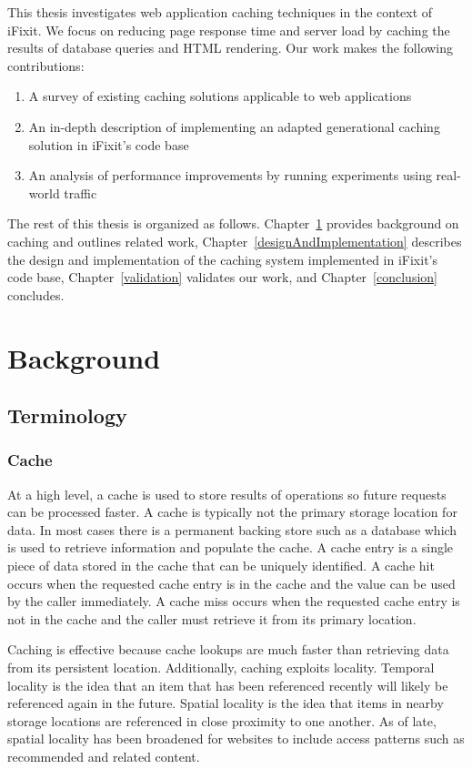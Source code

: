 \documentclass[12pt]{ucthesis}
\begin{document}
This thesis investigates web application caching techniques in the context of \textsf{iFixit}.
We focus on reducing page response time and server load by caching the results of database queries and HTML rendering.
Our work makes the following contributions:

\begin{enumerate}
   \item A survey of existing caching solutions applicable to web applications
   \item An in-depth description of implementing an adapted generational caching solution in \textsf{iFixit}'s code base
   \item An analysis of performance improvements by running experiments using real-world traffic
\end{enumerate}

The rest of this thesis is organized as follows.
Chapter~\ref{background} provides background on caching and outlines related work, Chapter~\ref{designAndImplementation} describes the design and implementation of the caching system implemented in \textsf{iFixit}'s code base, Chapter~\ref{validation} validates our work, and Chapter~\ref{conclusion} concludes.


\chapter{Background} \label{background}
\section{Terminology}
\subsection{Cache}
At a high level, a cache is used to store results of operations so future requests can be processed faster.
A cache is typically not the primary storage location for data.
In most cases there is a permanent backing store such as a database which is used to retrieve information and populate the cache.
A cache entry is a single piece of data stored in the cache that can be uniquely identified.
A cache hit occurs when the requested cache entry is in the cache and the value can be used by the caller immediately.
A cache miss occurs when the requested cache entry is not in the cache and the caller must retrieve it from its primary location.

Caching is effective because cache lookups are much faster than retrieving data from its persistent location.
Additionally, caching exploits locality.
Temporal locality is the idea that an item that has been referenced recently will likely be referenced again in the future.
Spatial locality is the idea that items in nearby storage locations are referenced in close proximity to one another.
As of late, spatial locality has been broadened for websites to include access patterns such as recommended and related content.
\end{document}

